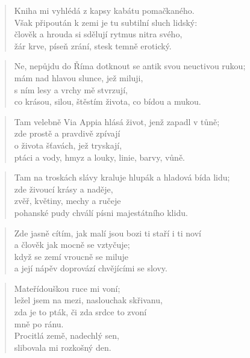 \documentclass{book}
\begin{document}
\begin{verse}
Kniha mi vyhlédá z kapsy kabátu pomačkaného.\\
Však připoután k zemi je tu subtilní sluch lidský:\\
člověk a hrouda si sdělují rytmus nitra svého,\\
žár krve, píseň zrání, stesk temně erotický.
\end{verse}
\newpage
{}
\begin{verse}
Ne, nepůjdu do Říma dotknout se antik svou neuctivou rukou;\\
mám nad hlavou slunce, jež miluji,\\
s ním lesy a vrchy mě stvrzují,\\
co krásou, silou, štěstím života, co bídou a mukou.
\end{verse}
\begin{verse}
Tam velebně Via Appia hlásá život, jenž zapadl v tůně;\\
zde prostě a pravdivě zpívají\\
o života šťavách, jež tryskají,\\
ptáci a vody, hmyz a louky, linie, barvy, vůně.
\end{verse}
\begin{verse}
Tam na troskách slávy kraluje hlupák a hladová bída lidu;\\
zde živoucí krásy a naděje,\\
zvěř, květiny, mechy a ručeje\\
pohanské pudy chválí písni majestátního klidu.
\end{verse}
\begin{verse}
Zde jasně cítím, jak malí jsou bozi ti staří i ti noví\\
a člověk jak mocně se vztyčuje;\\
když se zemí vroucně se miluje\\
a její nápěv doprovází chvějícími se slovy.
\end{verse}
\newpage
{}
\begin{verse}
Mateřídouškou ruce mi voní;\\
ležel jsem na mezi, naslouchak skřivanu,\\
zda je to pták, či zda srdce to zvoní\\
mně po ránu.\\
Procitlá země, nadechlý sen,\\
slibovala mi rozkošný den.\\
\end{verse}
\end{document}
